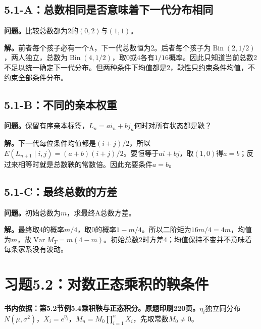 \documentclass[11pt,a4paper,UTF8,fontset=fandol]{ctexart}
\begin{document}
\subsection{5.1-A：总数相同是否意味着下一代分布相同}\label{aux603bux6570ux76f8ux540cux662fux5426ux610fux5473ux7740ux4e0bux4e00ux4ee3ux5206ux5e03ux76f8ux540c}

\textbf{问题。}比较总数都为2的\((0,2)\)与\((1,1)\)。

\textbf{解。}前者每个孩子必有一个A，下一代总数恒为2。后者每个孩子为\(\operatorname{Bin}(2,1/2)\)，两人独立，总数为\(\operatorname{Bin}(4,1/2)\)，取0或4各有\(1/16\)概率。因此只知道当前总数2不足以统一确定下一代分布。但两种条件下均值都是2，鞅性只约束条件均值，不约束全部条件分布。

\subsection{5.1-B：不同的亲本权重}\label{bux4e0dux540cux7684ux4eb2ux672cux6743ux91cd}

\textbf{问题。}保留有序亲本标签，\(L_n=ai_n+bj_n\)何时对所有状态都是鞅？

\textbf{解。}下一代每位条件均值都是\((i+j)/2\)，所以\(E(L_{n+1}\mid i,j)=(a+b)(i+j)/2\)。要恒等于\(ai+bj\)，取\((1,0)\)得\(a=b\)；反过来相等时就是总数鞅的常数倍。因此充要条件\(\boxed{a=b}\)。

\subsection{5.1-C：最终总数的方差}\label{cux6700ux7ec8ux603bux6570ux7684ux65b9ux5dee}

\textbf{问题。}初始总数为\(m\)，求最终A总数方差。

\textbf{解。}最终取4的概率\(m/4\)，取0的概率\(1-m/4\)。所以二阶矩为\(16m/4=4m\)，均值为\(m\)，故\(\boxed{\operatorname{Var}M_T=m(4-m)}\)。初始总数2时方差4；均值保持不变并不意味着每条家系没有波动。

\bigskip

\section{习题5.2：对数正态乘积的鞅条件}\label{ux4e60ux98985.2ux5bf9ux6570ux6b63ux6001ux4e58ux79efux7684ux9785ux6761ux4ef6}

\textbf{书内依据：第5.2节例5.4乘积鞅与正态积分。原题印刷220页。}\(\eta_i\)独立同分布\(N(\mu,\sigma^2)\)，\(X_i=e^{\eta_i}\)，\(M_n=M_0\prod_{i=1}^nX_i\)，先取常数\(M_0\ne0\)。
\end{document}
